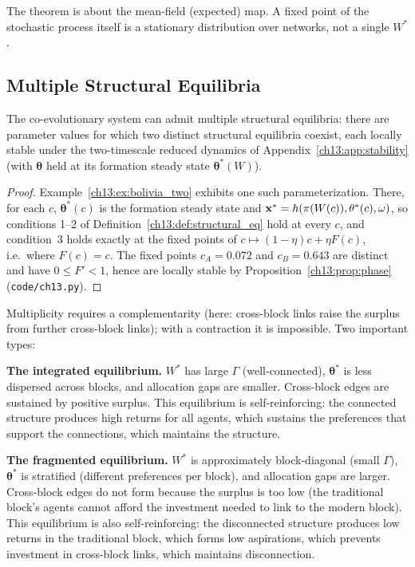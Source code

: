\documentclass[../structural_economics_book.tex]{subfiles}
\begin{document}
The theorem is about the mean-field (expected) map. A fixed point of the stochastic process itself is a stationary distribution over networks, not a single $W^*$.


\subsection{Multiple Structural Equilibria}

\begin{proposition}[Multiplicity]\label{ch13:prop:multiplicity}
The co-evolutionary system can admit multiple structural equilibria: there are parameter values for which two distinct structural equilibria coexist, each locally stable under the two-timescale reduced dynamics of Appendix~\ref{ch13:app:stability} (with $\boldsymbol{\theta}$ held at its formation steady state $\boldsymbol{\theta}^*(W)$).
\end{proposition}

\begin{proof}
Example~\ref{ch13:ex:bolivia_two} exhibits one such parameterization. There, for each $c$, $\boldsymbol{\theta}^*(c)$ is the formation steady state and $\mathbf{x}^* = h(\pi(W(c)), \theta^*(c), \omega)$, so conditions 1--2 of Definition~\ref{ch13:def:structural_eq} hold at every $c$, and condition~3 holds exactly at the fixed points of $c \mapsto (1-\eta)c + \eta F(c)$, i.e.\ where $F(c) = c$. The fixed points $c_A = 0.072$ and $c_B = 0.643$ are distinct and have $0 \le F' < 1$, hence are locally stable by Proposition~\ref{ch13:prop:phase} (\texttt{code/ch13.py}).
\end{proof}

Multiplicity requires a complementarity (here: cross-block links raise the surplus from further cross-block links); with a contraction it is impossible. Two important types:

\textbf{The integrated equilibrium.} $W^*$ has large $\Gamma$ (well-connected), $\boldsymbol{\theta}^*$ is less dispersed across blocks, and allocation gaps are smaller. Cross-block edges are sustained by positive surplus. This equilibrium is self-reinforcing: the connected structure produces high returns for all agents, which sustains the preferences that support the connections, which maintains the structure.

\textbf{The fragmented equilibrium.} $W^*$ is approximately block-diagonal (small $\Gamma$), $\boldsymbol{\theta}^*$ is stratified (different preferences per block), and allocation gaps are larger. Cross-block edges do not form because the surplus is too low (the traditional block's agents cannot afford the investment needed to link to the modern block). This equilibrium is also self-reinforcing: the disconnected structure produces low returns in the traditional block, which forms low aspirations, which prevents investment in cross-block links, which maintains disconnection.
\end{document}
